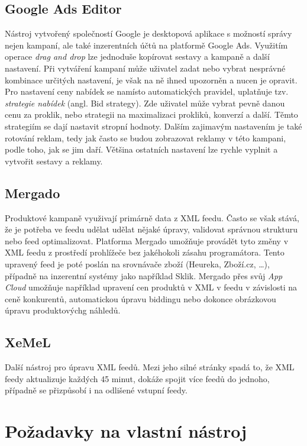 \subsection{Google Ads Editor}
Nástroj vytvořený společností Google je desktopová aplikace s možností správy nejen kampaní, ale také inzerentních účtů na platformě Google Ads. Využitím operace
\emph{drag and drop} lze jednoduše kopírovat sestavy a kampaně a další nastavení. Při vytváření kampaní může uživatel zadat nebo vybrat nesprávné kombinace určitých
nastavení, je však na ně ihned upozorněn a nucen je opravit. Pro nastavení ceny nabídek se namísto automatických pravidel,
uplatňuje tzv. \emph{strategie nabídek} (angl. Bid strategy). Zde uživatel může vybrat pevně danou cenu za proklik, nebo strategii na maximalizaci prokliků, konverzí
a další. Těmto strategiím se dají nastavit stropní hodnoty. Dalším zajimavým nastavením je také rotování reklam, tedy jak často se budou zobrazovat reklamy v této
kampani, podle toho, jak se jim daří. Většina ostatních nastavení lze rychle vyplnit a vytvořit sestavy a reklamy.

\subsection{Mergado}
Produktové kampaně využivají primárně data z XML feedu. Často se však stává, že je potřeba ve feedu udělat udělat nějaké úpravy, validovat správnou strukturu nebo feed
optimalizovat. Platforma Mergado umožňuje provádět tyto změny v XML feedu z prostředí prohlížeče bez jakéhokoli zásahu programátora. Tento upravený feed je poté
poslán na srovnávače zboží (Heureka, Zboží.cz, \ldots), případně na inzerentní systémy jako například Sklik. Mergado přes svůj \emph{App Cloud} umožňuje například
upravení cen produktů v XML v feedu v závislosti na ceně konkurentů, automatickou úpravu biddingu nebo dokonce obrázkovou úpravu produktovýchg náhledů.

\subsection{XeMeL}
Další nástroj pro úpravu XML feedů. Mezi jeho silné stránky spadá to, že XML feedy aktualizuje každých 45 minut, dokáže spojit více feedů do jednoho, případně
se přizpůsobí i na odlišené vstupní feedy.

\section{Požadavky na vlastní nástroj}

